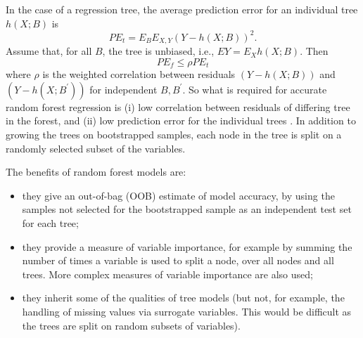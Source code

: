 \documentclass[10pt,letterpaper]{article}
\begin{document}
In the case of a regression tree, the average prediction error for an individual tree $h(X; B)$ is
\begin{equation}
PE_t = E_B E_{X,Y} (Y-h(X; B))^2.
\end{equation}
Assume that, for all $B$, the tree is unbiased, i.e., $EY= E_X h(X; B)$. Then
\begin{equation}
PE_f \leq \rho PE_t
\end{equation}
where $\rho$ is the weighted correlation between residuals $(Y-h(X;B))$ and $(Y-h(X;B^\prime))$ for independent $B,B^\prime$.  
So what is required for accurate random forest regression is (i) low correlation between residuals of differing tree in
the forest, and (ii) low prediction error for the individual trees \cite{Segal.2004}. In addition to growing the trees
on bootstrapped samples, each node in the tree is split on a randomly selected subset of the variables.

The benefits of random forest models are:
\begin{itemize}
\item they give an out-of-bag (OOB) estimate of model accuracy, by using the samples not selected for the bootstrapped sample
  as an independent test set for each tree;
\item they provide a measure of variable importance, for example by summing the number of times a variable is used to
  split a node, over all nodes and all trees. More complex measures of variable importance are also used;
\item they inherit some of the qualities of tree models (but not, for example, the handling of missing values via surrogate
  variables. This would be difficult as the trees are split on random subsets of variables).
\end{itemize}
\end{document}
